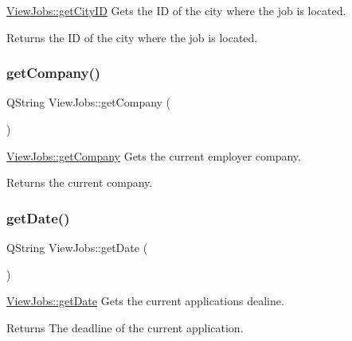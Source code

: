 \hyperlink{class_view_jobs_adcafeca350b21a033aa630e042ee7947}{View\+Jobs\+::get\+City\+ID} Gets the ID of the city where the job is located. 

\begin{DoxyReturn}{Returns}
the ID of the city where the job is located. 
\end{DoxyReturn}
\mbox{\label{class_view_jobs_a88d7c0a7a79bc7a7e02b524587983bf8}} 
\subsubsection{\texorpdfstring{get\+Company()}{getCompany()}}
{\footnotesize\ttfamily Q\+String View\+Jobs\+::get\+Company (\begin{DoxyParamCaption}{ }\end{DoxyParamCaption})}



\hyperlink{class_view_jobs_a88d7c0a7a79bc7a7e02b524587983bf8}{View\+Jobs\+::get\+Company} Gets the current employer company. 

\begin{DoxyReturn}{Returns}
the current company. 
\end{DoxyReturn}
\mbox{\label{class_view_jobs_af046f9201cc6031e070b4f9b613a35f9}} 
\subsubsection{\texorpdfstring{get\+Date()}{getDate()}}
{\footnotesize\ttfamily Q\+String View\+Jobs\+::get\+Date (\begin{DoxyParamCaption}{ }\end{DoxyParamCaption})}



\hyperlink{class_view_jobs_af046f9201cc6031e070b4f9b613a35f9}{View\+Jobs\+::get\+Date} Gets the current application\textquotesingle{}s dealine. 

\begin{DoxyReturn}{Returns}
The deadline of the current application. 
\end{DoxyReturn}
\mbox{\label{class_view_jobs_a91696fde9f0a663bae929390aac8324b}} 
